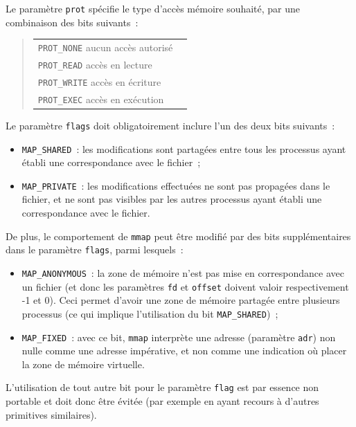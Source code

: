 \documentclass [twoside] {report}
\begin{document}
Le paramètre \texttt {prot} spécifie le type d'accès mémoire
souhaité, par une combinaison des bits suivants~:

\begin {quote}
    \begin {tabular} {|ll|} \hline
	\texttt {PROT\_NONE} aucun accès autorisé \\
	\texttt {PROT\_READ} accès en lecture \\
	\texttt {PROT\_WRITE} accès en écriture \\
	\texttt {PROT\_EXEC} accès en exécution \\
	\hline
    \end {tabular}
\end {quote}

Le paramètre \texttt {flags} doit obligatoirement inclure l'un des deux
bits suivants~:

\begin {itemize}
    \item \texttt {MAP\_SHARED}~: les modifications sont partagées entre
	tous les processus ayant établi une correspondance avec le
	fichier~;
    \item \texttt {MAP\_PRIVATE}~: les modifications effectuées ne sont
	pas propagées dans le fichier, et ne sont pas visibles par les
	autres processus ayant établi une correspondance avec le fichier.

\end {itemize}

De plus, le comportement de \texttt {mmap} peut être modifié par des
bits supplémentaires dans le paramètre \texttt {flags}, parmi lesquels~:

\begin {itemize}
    \item \texttt {MAP\_ANONYMOUS}~: la zone de mémoire n'est pas mise
	en correspondance avec un fichier (et donc les paramètres
	\texttt {fd} et \texttt {offset} doivent valoir respectivement
	-1 et 0).  Ceci permet d'avoir une zone de mémoire partagée
	entre plusieurs processus (ce qui implique l'utilisation du bit
	\texttt {MAP\_SHARED})~;

    \item \texttt {MAP\_FIXED}~: avec ce bit, \texttt {mmap} interprète
	une adresse (paramètre \texttt {adr}) non nulle comme une
	adresse impérative, et non comme une indication où placer la
	zone de mémoire virtuelle.

\end {itemize}

L'utilisation de tout autre bit pour le paramètre \texttt {flag} est
par essence non portable et doit donc être évitée (par exemple en
ayant recours à d'autres primitives similaires).
\end{document}
